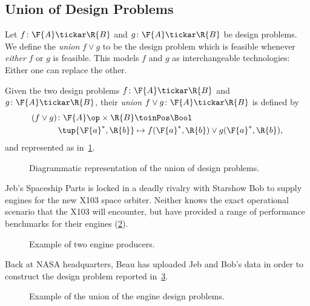 \subsection{Union of Design Problems}
Let $f\colon \F{A}\tickar \R{B}$ and $g\colon \F{A}\tickar \R{B}$ be design problems. We define the \emph{union} $f \vee g$ to be the design problem which is feasible whenever \emph{either} $f$ or $g$ is feasible. This models $f$ and $g$ as interchangeable technologies: Either one can replace the other.

\begin{definition}
Given the two design problems $f \colon \F{A} \tickar \R{B}$ and $g \colon \F{A} \tickar \R{B}$, their \emph{union} $f \vee g \colon \F{A} \tickar \R{B}$ is defined by
\begin{equation}
\begin{aligned}
(f \vee g)\colon \F{A}\op \times \R{B} & \toinPos \Bool \\
\tup{\F{a}^*, \R{b}} & \mapsto f(\F{a}^*, \R{b}) \vee g(\F{a}^*, \R{b}),
\end{aligned}
\end{equation}
and represented as in~\cref{fig:uniondp}.
\end{definition}

\begin{figure}[h!]
\begin{center}
\end{center}
\caption{Diagrammatic representation of the union of design problems. \label{fig:uniondp}}
\end{figure}

\begin{example}
Jeb's Spaceship Parts is locked in a deadly rivalry with Starshow Bob to supply engines for the new X103 space orbiter. Neither knows the exact operational scenario that the X103 will encounter, but have provided a range of performance benchmarks for their engines (\cref{fig:exunion_1}).
\begin{figure}[h!]
\begin{center}
\end{center}
\caption{Example of two engine producers. \label{fig:exunion_1}}
\end{figure}
Back at NASA headquarters, Beau has uploaded Jeb and Bob's data in order to construct the design problem reported in~\cref{fig:exunion_2}.
\begin{figure}[h!]
\begin{center}
\end{center}
\caption{Example of the union of the engine design problems. \label{fig:exunion_2}}
\end{figure}
\end{example}


